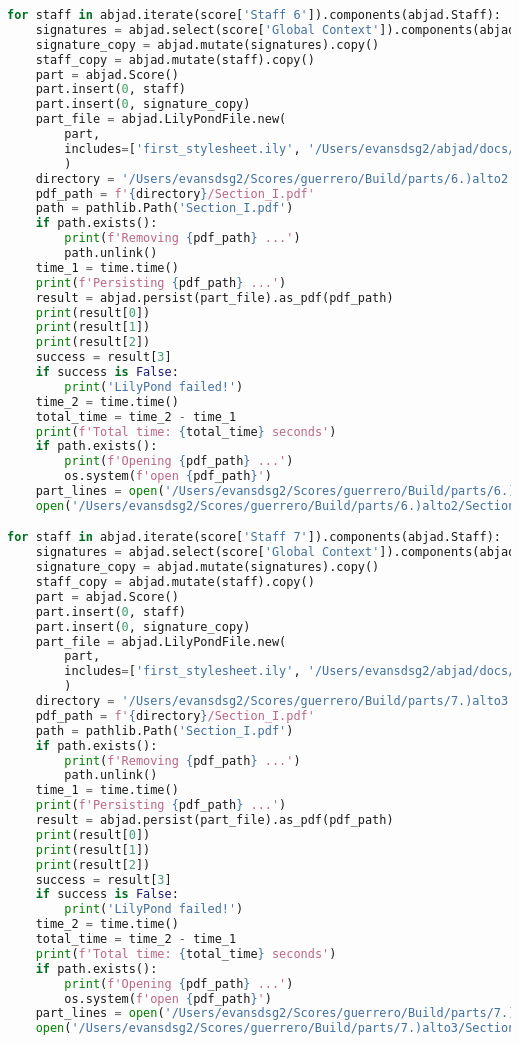 \begin{lstlisting}[language=Python, caption=Invocation Source Code]
for staff in abjad.iterate(score['Staff 6']).components(abjad.Staff):
    signatures = abjad.select(score['Global Context']).components(abjad.Staff)
    signature_copy = abjad.mutate(signatures).copy()
    staff_copy = abjad.mutate(staff).copy()
    part = abjad.Score()
    part.insert(0, staff)
    part.insert(0, signature_copy)
    part_file = abjad.LilyPondFile.new(
        part,
        includes=['first_stylesheet.ily', '/Users/evansdsg2/abjad/docs/source/_stylesheets/abjad.ily'],
        )
    directory = '/Users/evansdsg2/Scores/guerrero/Build/parts/6.)alto2'
    pdf_path = f'{directory}/Section_I.pdf'
    path = pathlib.Path('Section_I.pdf')
    if path.exists():
        print(f'Removing {pdf_path} ...')
        path.unlink()
    time_1 = time.time()
    print(f'Persisting {pdf_path} ...')
    result = abjad.persist(part_file).as_pdf(pdf_path)
    print(result[0])
    print(result[1])
    print(result[2])
    success = result[3]
    if success is False:
        print('LilyPond failed!')
    time_2 = time.time()
    total_time = time_2 - time_1
    print(f'Total time: {total_time} seconds')
    if path.exists():
        print(f'Opening {pdf_path} ...')
        os.system(f'open {pdf_path}')
    part_lines = open('/Users/evansdsg2/Scores/guerrero/Build/parts/6.)alto2/Section_I.ly').readlines()
    open('/Users/evansdsg2/Scores/guerrero/Build/parts/6.)alto2/Section_I.ly', 'w').writelines(part_lines[15:-1])

for staff in abjad.iterate(score['Staff 7']).components(abjad.Staff):
    signatures = abjad.select(score['Global Context']).components(abjad.Staff)
    signature_copy = abjad.mutate(signatures).copy()
    staff_copy = abjad.mutate(staff).copy()
    part = abjad.Score()
    part.insert(0, staff)
    part.insert(0, signature_copy)
    part_file = abjad.LilyPondFile.new(
        part,
        includes=['first_stylesheet.ily', '/Users/evansdsg2/abjad/docs/source/_stylesheets/abjad.ily'],
        )
    directory = '/Users/evansdsg2/Scores/guerrero/Build/parts/7.)alto3'
    pdf_path = f'{directory}/Section_I.pdf'
    path = pathlib.Path('Section_I.pdf')
    if path.exists():
        print(f'Removing {pdf_path} ...')
        path.unlink()
    time_1 = time.time()
    print(f'Persisting {pdf_path} ...')
    result = abjad.persist(part_file).as_pdf(pdf_path)
    print(result[0])
    print(result[1])
    print(result[2])
    success = result[3]
    if success is False:
        print('LilyPond failed!')
    time_2 = time.time()
    total_time = time_2 - time_1
    print(f'Total time: {total_time} seconds')
    if path.exists():
        print(f'Opening {pdf_path} ...')
        os.system(f'open {pdf_path}')
    part_lines = open('/Users/evansdsg2/Scores/guerrero/Build/parts/7.)alto3/Section_I.ly').readlines()
    open('/Users/evansdsg2/Scores/guerrero/Build/parts/7.)alto3/Section_I.ly', 'w').writelines(part_lines[15:-1])


\end{lstlisting}
